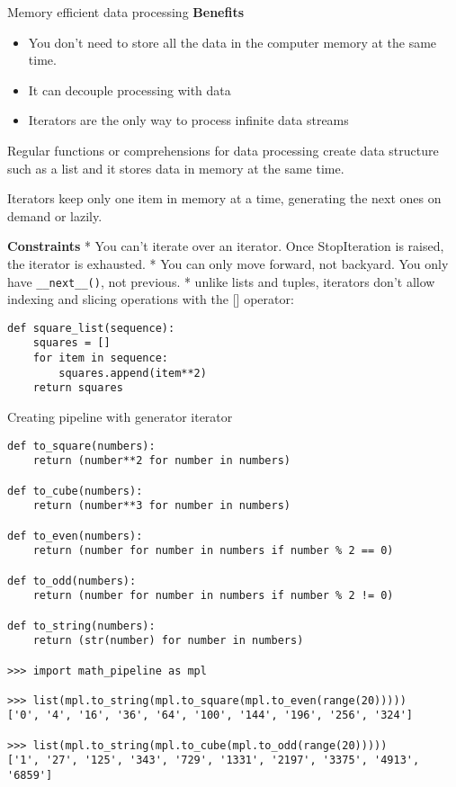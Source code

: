 \documentclass[
  ignorenonframetext,
]{beamer}
\providecommand{\tightlist}{%
  \setlength{\itemsep}{0pt}\setlength{\parskip}{0pt}}\usepackage{longtable,booktabs,array}
\begin{document}
\begin{frame}[fragile]{Memory efficient data processing}
\label{memory-efficient-data-processing}
\textbf{Benefits}

\begin{itemize}
\tightlist
\item
  You don't need to store all the data in the computer memory at the
  same time.
\item
  It can decouple processing with data
\item
  Iterators are the only way to process infinite data streams
\end{itemize}

Regular functions or comprehensions for data processing create data
structure such as a list and it stores data in memory at the same time.

Iterators keep only one item in memory at a time, generating the next
ones on demand or lazily.

\textbf{Constraints} * You can't iterate over an iterator. Once
StopIteration is raised, the iterator is exhausted. * You can only move
forward, not backyard. You only have \texttt{\_\_next\_\_()}, not
previous. * unlike lists and tuples, iterators don't allow indexing and
slicing operations with the {[}{]} operator:

\begin{verbatim}
def square_list(sequence):
    squares = []
    for item in sequence:
        squares.append(item**2)
    return squares 
\end{verbatim}

\begin{block}{Creating pipeline with generator iterator}
\label{creating-pipeline-with-generator-iterator}
\begin{verbatim}
def to_square(numbers):
    return (number**2 for number in numbers)

def to_cube(numbers):
    return (number**3 for number in numbers)

def to_even(numbers):
    return (number for number in numbers if number % 2 == 0)

def to_odd(numbers):
    return (number for number in numbers if number % 2 != 0)

def to_string(numbers):
    return (str(number) for number in numbers)

>>> import math_pipeline as mpl

>>> list(mpl.to_string(mpl.to_square(mpl.to_even(range(20)))))
['0', '4', '16', '36', '64', '100', '144', '196', '256', '324']

>>> list(mpl.to_string(mpl.to_cube(mpl.to_odd(range(20)))))
['1', '27', '125', '343', '729', '1331', '2197', '3375', '4913', '6859']
\end{verbatim}
\end{block}
\end{frame}
\end{document}
